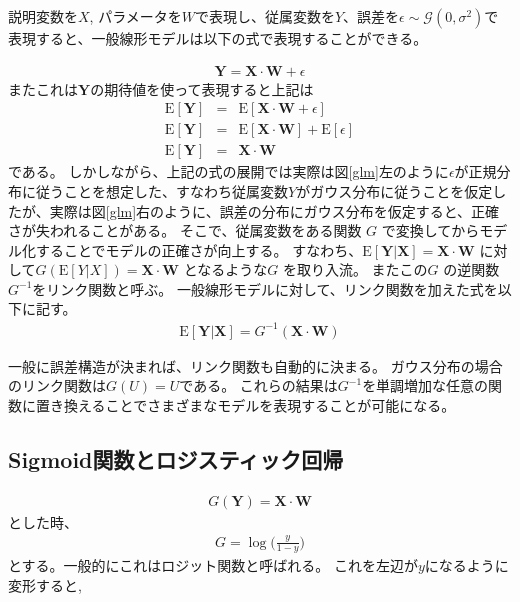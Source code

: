 説明変数を$ X $, パラメータを$ W $で表現し、従属変数を$ Y $、誤差を$ \epsilon \sim \mathcal{G}(0, \sigma^2) $で表現すると、一般線形モデルは以下の式で表現することができる。

\begin{eqnarray}
\mathbf{Y} = \mathbf{X} \cdot  \mathbf{W} + \epsilon
\label{eq:senkei}
\end{eqnarray}
またこれは$ \mathbf{Y} $の期待値を使って表現すると上記は
\begin{eqnarray}
    \mathrm{E}[\mathbf{Y}] &=& \mathrm{E}[\mathbf{X} \cdot  \mathbf{W} + \epsilon] \\
    \mathrm{E}[\mathbf{Y}] &=& \mathrm{E}[\mathbf{X} \cdot  \mathbf{W}] + \mathrm{E}[\epsilon] \\
    \mathrm{E}[\mathbf{Y}] &=& \mathbf{X} \cdot  \mathbf{W}
\label{eq:link}
\end{eqnarray}
である。
しかしながら、上記の式の展開では実際は図\ref{glm}左のように$ \epsilon $が正規分布に従うことを想定した、すなわち従属変数$ Y $がガウス分布に従うことを仮定したが、実際は図\ref{glm}右のように、誤差の分布にガウス分布を仮定すると、正確さが失われることがある。
そこで、従属変数をある関数 $ G $ で変換してからモデル化することでモデルの正確さが向上する。
すなわち、$ \mathrm{E}[\mathbf{Y|X}] = \mathbf{X} \cdot  \mathbf{W} $ に対して$ G(\mathrm{E}[Y|X]) = \mathbf{X} \cdot  \mathbf{W} $ となるような$ G $ を取り入流。
またこの$ G $ の逆関数 $ G^{-1} $をリンク関数と呼ぶ。
一般線形モデルに対して、リンク関数を加えた式を以下に記す。
\begin{eqnarray}
\mathrm{E}[\mathbf{Y|X}]=G^{-1} (\mathbf{X}\cdot  \mathbf{W})
\label{eq:link}
\end{eqnarray}

一般に誤差構造が決まれば、リンク関数も自動的に決まる。
ガウス分布の場合のリンク関数は$ G(U) = U $である。
これらの結果は$ G^{-1} $を単調増加な任意の関数に置き換えることでさまざまなモデルを表現することが可能になる。


\subsection{Sigmoid関数とロジスティック回帰}
\label{history_sigmoid}
\begin{eqnarray}
G(\mathbf{Y})=\mathbf{X}\cdot  \mathbf{W}
\end{eqnarray}
とした時、
\begin{eqnarray}
G=\log \bigl(\frac{y}{1-y}\bigr)
\end{eqnarray}
とする。一般的にこれはロジット関数と呼ばれる。
これを左辺が$ y $になるように変形すると,

